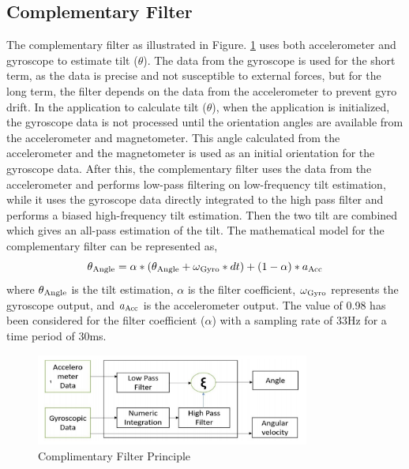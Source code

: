 \documentclass[conference]{IEEEtran}
\begin{document}
\subsection{Complementary Filter}
The complementary filter as illustrated in Figure. \ref{fig:ComplimentaryFilterPrinciple} uses both accelerometer and gyroscope to estimate tilt ($\theta$). The data from the gyroscope is used for the short term, as the data is precise and not susceptible to external forces, but for the long term, the filter depends on the data from the accelerometer to prevent gyro drift. In the application to calculate tilt ($\theta$), when the application is initialized, the gyroscope data is not processed until the orientation angles are available from the accelerometer and magnetometer. This angle calculated from the accelerometer and the magnetometer is used as an initial orientation for the gyroscope data. After this, the complementary filter uses the data from the accelerometer and performs low-pass filtering on low-frequency tilt estimation, while it uses the gyroscope data directly integrated to the high pass filter and performs a biased high-frequency tilt estimation. Then the two tilt are combined which gives an all-pass estimation of the tilt. The mathematical model for the complementary filter can be represented as,
\begin{equation}
\theta\textsubscript{Angle} = \alpha * (\theta\textsubscript{Angle} + \omega\textsubscript{Gyro} * dt) + (1 - \alpha) * a\textsubscript{Acc} \label{eq:4}
\end{equation}
where $\theta\textsubscript{Angle}$ is the tilt estimation, $\alpha$ is the filter coefficient, $\omega\textsubscript{Gyro}$ represents the gyroscope output, and $a\textsubscript{Acc}$ is the accelerometer output. The value of 0.98 has been considered for the filter coefficient ($\alpha$) with a sampling rate of 33Hz for a time period of 30ms.

\begin{figure}
\centerline{\includegraphics[width=9cm, height=3cm]{ComplimentaryFilterAlgorithm.png}}
\caption{Complimentary Filter Principle\cite{b10}}
\label{fig:ComplimentaryFilterPrinciple}
\end{figure}
\end{document}
